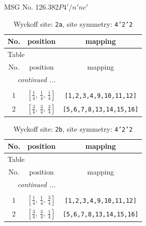 \documentclass[fleqn,8pt]{jsarticle}
\begin{document}
\setcounter{MaxMatrixCols}{32}

\renewcommand{\tablename}{Table~}
\renewcommand{\figurename}{Figure~}
\begin{center}
\LARGE
MSG No. 126.382\quad$P4'/n'nc'$
\end{center}
\renewcommand{\arraystretch}{1.2}
\begin{longtable}{ccc}
\caption{Wyckoff site: {\tt 2a}, site symmetry: {\tt 4'2'2}}
 \\
 \hline \hline
No. & position & mapping \\ \hline \endfirsthead

\multicolumn{2}{l}{\tablename\ \thetable{}} \\
 \hline \hline
No. & position & mapping \\ \hline \endhead

 \hline \hline
\multicolumn{2}{r}{\footnotesize\it continued ...} \\ \endfoot

 \hline \hline
\multicolumn{2}{r}{} \\ \endlastfoot

1 & $\left[ \frac{1}{4},\, \frac{1}{4},\, \frac{1}{4} \right]$ & {\tt [1,2,3,4,9,10,11,12]} \\ \hline
2 & $\left[ \frac{3}{4},\, \frac{3}{4},\, \frac{3}{4} \right]$ & {\tt [5,6,7,8,13,14,15,16]} \\
\end{longtable}
\renewcommand{\arraystretch}{1.2}
\begin{longtable}{ccc}
\caption{Wyckoff site: {\tt 2b}, site symmetry: {\tt 4'2'2}}
 \\
 \hline \hline
No. & position & mapping \\ \hline \endfirsthead

\multicolumn{2}{l}{\tablename\ \thetable{}} \\
 \hline \hline
No. & position & mapping \\ \hline \endhead

 \hline \hline
\multicolumn{2}{r}{\footnotesize\it continued ...} \\ \endfoot

 \hline \hline
\multicolumn{2}{r}{} \\ \endlastfoot

1 & $\left[ \frac{1}{4},\, \frac{1}{4},\, \frac{3}{4} \right]$ & {\tt [1,2,3,4,9,10,11,12]} \\ \hline
2 & $\left[ \frac{3}{4},\, \frac{3}{4},\, \frac{1}{4} \right]$ & {\tt [5,6,7,8,13,14,15,16]} \\
\end{longtable}
\end{document}
